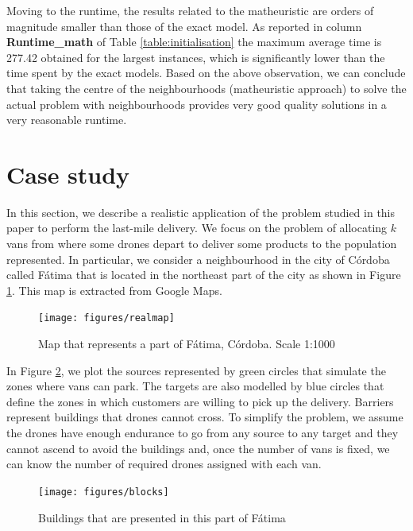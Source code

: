 \documentclass[a4paper,  review, authoryear, 1p.]{elsarticle}
\begin{document}
Moving to the runtime, the results related to the matheuristic are orders of magnitude smaller than those of the exact model. 	As reported in column \textbf{Runtime\_math} of Table \ref{table:initialisation} the maximum average time is 277.42 obtained for the largest instances, which is significantly lower than the time spent by the exact models. Based on the above observation, we can conclude that taking the centre of the neighbourhoods (matheuristic approach) to solve the actual problem with neighbourhoods provides very good quality solutions in a very reasonable runtime.
			
				
				
%				
%		
		
		\section{Case study}\label{section:casestudy}
		In this section, we describe a realistic application of the problem studied in this paper to perform the last-mile delivery. We focus on the problem of allocating $k$ vans from where some drones depart to deliver some products to the population represented. In particular, we consider a neighbourhood in the city of Córdoba called Fátima that is located in the northeast part of the city as shown in Figure \ref{fig:realmap}. This map is extracted from Google Maps.
		
		\begin{figure}[H]
			\centering
			\caption{Map that represents a part of Fátima, Córdoba. Scale 1:1000}
			\texttt{[image: figures/realmap]}
			\label{fig:realmap}

		\end{figure}
		
		In Figure \ref{fig:blocks}, we plot the sources represented by green circles that simulate the zones where vans can park. The targets are also modelled by blue circles that define the zones in which customers are willing to pick up the delivery. Barriers represent buildings that drones cannot cross. To simplify the problem, we assume the drones have enough endurance to go from any source to any target and they cannot ascend to avoid the buildings and, once the number of vans is fixed, we can know the number of required drones assigned with each van.
		
		\begin{figure}[H]
			\centering
			\caption{Buildings that are presented in this part of Fátima}
			\texttt{[image: figures/blocks]}
			\label{fig:blocks}
		\end{figure}
		
\end{document}
